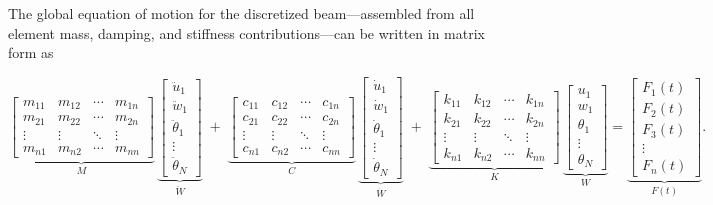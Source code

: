 \documentclass{article}
\begin{document}
	The global equation of motion for the discretized beam—assembled from all element mass, damping, and stiffness contributions—can be written in matrix form as
	
	\begin{equation}\label{eq:global_expanded}
		\underbrace{\begin{bmatrix}
				m_{11} & m_{12} & \cdots & m_{1n}\\
				m_{21} & m_{22} & \cdots & m_{2n}\\
				\vdots & \vdots & \ddots & \vdots\\
				m_{n1} & m_{n2} & \cdots & m_{nn}
		\end{bmatrix}}_{M}
		\,
		\underbrace{\begin{bmatrix}
				\ddot u_1\\[4pt]
				\ddot w_1\\[4pt]
				\ddot \theta_1 \\[2pt]
				\vdots \\[2pt]
				\ddot \theta_N
		\end{bmatrix}}_{\ddot W}
		\;+\;
		\underbrace{\begin{bmatrix}
				c_{11} & c_{12} & \cdots & c_{1n}\\
				c_{21} & c_{22} & \cdots & c_{2n}\\
				\vdots & \vdots & \ddots & \vdots\\
				c_{n1} & c_{n2} & \cdots & c_{nn}
		\end{bmatrix}}_{C}
		\,
		\underbrace{\begin{bmatrix}
				\dot u_1\\[4pt]
				\dot w_1\\[4pt]
				\dot \theta_1 \\[2pt]
				\vdots \\[2pt]
				\dot \theta_N
		\end{bmatrix}}_{\dot W}
		\;+\;
		\underbrace{\begin{bmatrix}
				k_{11} & k_{12} & \cdots & k_{1n}\\
				k_{21} & k_{22} & \cdots & k_{2n}\\
				\vdots & \vdots & \ddots & \vdots\\
				k_{n1} & k_{n2} & \cdots & k_{nn}
		\end{bmatrix}}_{K}
		\,
		\underbrace{\begin{bmatrix}
				u_1\\[4pt]
				w_1\\[4pt]
				\theta_1 \\[2pt]
				\vdots \\[2pt]
				\theta_N
		\end{bmatrix}}_{W}
		=
		\underbrace{\begin{bmatrix}
				F_1(t)\\[4pt]
				F_2(t)\\[4pt]
				F_3(t) \\[2pt]
				\vdots \\[2pt]
				F_n(t)
		\end{bmatrix}}_{F(t)}.
	\end{equation}
	
\end{document}
